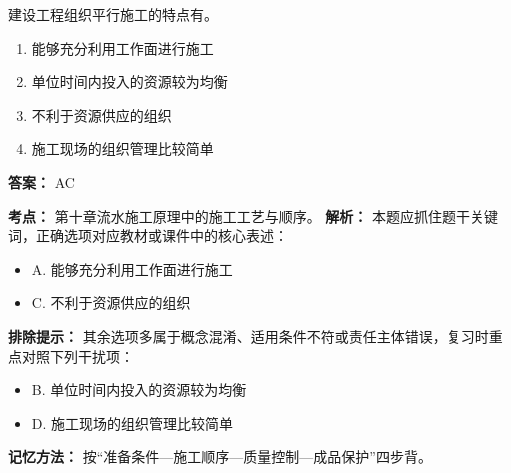 \documentclass[UTF8,fontset=fandol,11pt]{ctexart}
\begin{document}
\begin{quizbox}[title={第 15 题}]
建设工程组织平行施工的特点有。\\
\begin{enumerate}[label=\Alph*.]
\item 能够充分利用工作面进行施工
\item 单位时间内投入的资源较为均衡
\item 不利于资源供应的组织
\item 施工现场的组织管理比较简单
\end{enumerate}
\textbf{答案：} AC
\vspace{0.25em}
\begin{answerbox}[title={考点解析}]
\textbf{考点：} 第十章流水施工原理中的施工工艺与顺序。
\textbf{解析：} 本题应抓住题干关键词，正确选项对应教材或课件中的核心表述：
\begin{itemize}
\item A. 能够充分利用工作面进行施工
\item C. 不利于资源供应的组织
\end{itemize}
\textbf{排除提示：} 其余选项多属于概念混淆、适用条件不符或责任主体错误，复习时重点对照下列干扰项：
\begin{itemize}
\item B. 单位时间内投入的资源较为均衡
\item D. 施工现场的组织管理比较简单
\end{itemize}
\textbf{记忆方法：} 按“准备条件—施工顺序—质量控制—成品保护”四步背。
\end{answerbox}
\end{quizbox}
\end{document}
